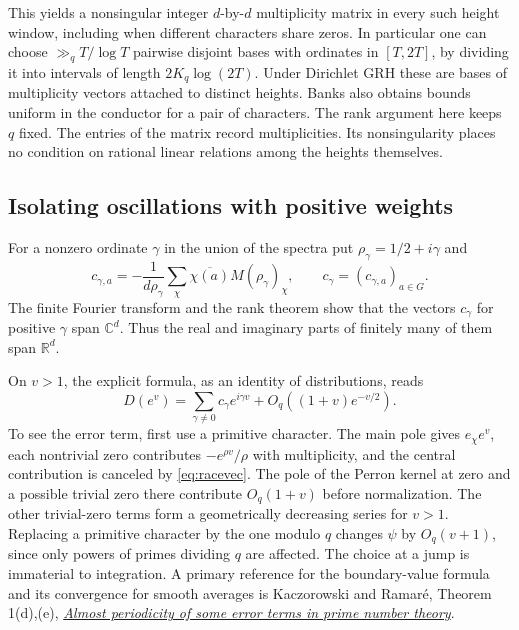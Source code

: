 This yields a nonsingular integer $d$-by-$d$ multiplicity matrix in
every such height window, including when different characters share zeros.
In particular one can choose $\gg_q T/\log T$ pairwise disjoint
bases with ordinates in $[T,2T]$, by dividing it into intervals of
length $2K_q\log(2T)$. Under Dirichlet GRH these are bases of
multiplicity vectors attached to distinct heights. 
Banks also obtains bounds uniform in the conductor for a pair of
characters. The rank argument here keeps $q$ fixed. The entries of the
matrix record multiplicities. Its nonsingularity places no condition
on rational linear relations among the heights themselves.

\subsection{Isolating oscillations with positive weights}

For a nonzero ordinate $\gamma$ in the union of the spectra put
$\rho_\gamma=1/2+i\gamma$ and
\[
 c_{\gamma,a}=-\frac{1}{d\rho_\gamma}
               \sum_\chi \overline{\chi(a)} M(\rho_\gamma)_\chi,
 \qquad c_\gamma=(c_{\gamma,a})_{a\in G}.
\]
The finite Fourier transform and the rank theorem show that the
vectors $c_\gamma$ for positive $\gamma$ span $\mathbb C^d$.
Thus the real and imaginary parts of finitely many of them span $\mathbb R^d$.

On $v>1$, the explicit formula, as an identity of distributions, reads
\[
 D(e^v)=\sum_{\gamma\ne0}c_\gamma e^{i\gamma v}
          +O_q((1+v)e^{-v/2}).\tag{E}\label{eq:explicitvec}
\]
To see the error term, first use a primitive character. The main pole
gives $e_\chi e^v$, each nontrivial zero contributes $-e^{\rho v}/\rho$
with multiplicity, and the central contribution is canceled by
\eqref{eq:racevec}. The pole of the Perron kernel at zero and a possible
trivial zero there contribute $O_q(1+v)$ before normalization.
The other trivial-zero terms form a geometrically decreasing series
for $v>1$. Replacing a primitive character by the one modulo $q$
changes $\psi$ by $O_q(v+1)$, since only powers of primes dividing $q$
are affected. The choice at a jump is immaterial to integration.
A primary reference for the boundary-value formula and its convergence
for smooth averages is Kaczorowski and Ramar\'e, Theorem 1(d),(e),
\href{https://doi.org/10.4064/aa106-3-6}{\emph{Almost periodicity of some
error terms in prime number theory}}.

